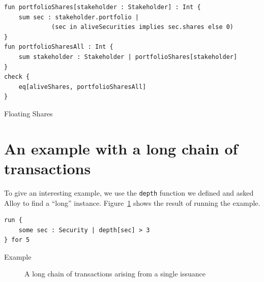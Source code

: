 \begin{listing}[!h]
	\begin{verbatim}
fun portfolioShares[stakeholder : Stakeholder] : Int {
    sum sec : stakeholder.portfolio | 
             (sec in aliveSecurities implies sec.shares else 0)
}
fun portfolioSharesAll : Int {
    sum stakeholder : Stakeholder | portfolioShares[stakeholder]
}
check {
    eq[aliveShares, portfolioSharesAll]
}
\end{verbatim}
	\caption{Floating Shares}
\label{lst:tt-alloy-properties-floating-shares}
\end{listing}

\section{An example with a long chain of transactions}


To give an interesting example, we use the \verb|depth| function we defined and asked Alloy to find a ``long'' instance. 
%
Figure~\ref{fig:tt-alloy-example-transaction-single-issuance} shows the result of running the example. 

\begin{listing}[!h]
	\begin{verbatim}
run {
    some sec : Security | depth[sec] > 3
} for 5
\end{verbatim}
	\caption{Example}
\label{lst:tt-alloy-example}
\end{listing}


\begin{figure}[!h]
	\centering
	\caption{A long chain of \glspl{transaction} arising from a single issuance}\label{fig:tt-alloy-example-transaction-single-issuance}
\end{figure}

